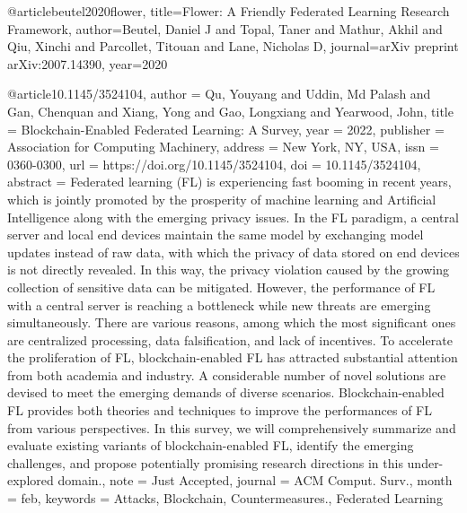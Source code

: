 @article{beutel2020flower,
  title={Flower: A Friendly Federated Learning Research Framework},
  author={Beutel, Daniel J and Topal, Taner and Mathur, Akhil and Qiu, Xinchi and Parcollet, Titouan and Lane, Nicholas D},
  journal={arXiv preprint arXiv:2007.14390},
  year={2020}
}

@article{10.1145/3524104,
author = {Qu, Youyang and Uddin, Md Palash and Gan, Chenquan and Xiang, Yong and Gao, Longxiang and Yearwood, John},
title = {Blockchain-Enabled Federated Learning: A Survey},
year = {2022},
publisher = {Association for Computing Machinery},
address = {New York, NY, USA},
issn = {0360-0300},
url = {https://doi.org/10.1145/3524104},
doi = {10.1145/3524104},
abstract = {Federated learning (FL) is experiencing fast booming in recent years, which is jointly promoted by the prosperity of machine learning and Artificial Intelligence along with the emerging privacy issues. In the FL paradigm, a central server and local end devices maintain the same model by exchanging model updates instead of raw data, with which the privacy of data stored on end devices is not directly revealed. In this way, the privacy violation caused by the growing collection of sensitive data can be mitigated. However, the performance of FL with a central server is reaching a bottleneck while new threats are emerging simultaneously. There are various reasons, among which the most significant ones are centralized processing, data falsification, and lack of incentives. To accelerate the proliferation of FL, blockchain-enabled FL has attracted substantial attention from both academia and industry. A considerable number of novel solutions are devised to meet the emerging demands of diverse scenarios. Blockchain-enabled FL provides both theories and techniques to improve the performances of FL from various perspectives. In this survey, we will comprehensively summarize and evaluate existing variants of blockchain-enabled FL, identify the emerging challenges, and propose potentially promising research directions in this under-explored domain.},
note = {Just Accepted},
journal = {ACM Comput. Surv.},
month = {feb},
keywords = {Attacks, Blockchain, Countermeasures., Federated Learning}
}

